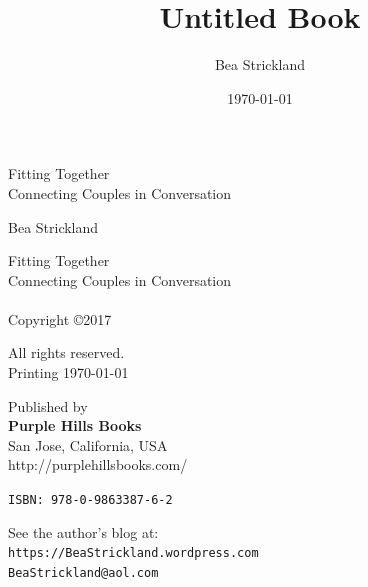 

\usepackage{lineno}



\frontmatter



\cleardoublepage
\title{Untitled Book}
\author{Bea Strickland}
\date{\today}


\begin{center}

{\noindent\huge Fitting Together\\}
{\noindent Connecting Couples in Conversation \\}

\vspace{0.75in}

{\noindent Bea Strickland}

\vspace{1in}


\end{center}


\newpage
{
    \noindent
    Fitting Together\\
    Connecting Couples in Conversation\\
    \\
    Copyright \copyright 2017 
    \newline

    \noindent
    All rights reserved.\\
    Printing \today
    \newline

    \noindent
    Published by \\
    \textbf{Purple Hills Books}\\
    San Jose, California, USA\\
    http://purplehillsbooks.com/


    \vspace{0.25in}
    \noindent
    \texttt{ISBN: 978-0-9863387-6-2}

    \vspace{0.75in}
    \noindent
    See the author's blog at:\\
    \texttt{https://BeaStrickland.wordpress.com}\\
    \texttt{BeaStrickland@aol.com}
}

\newpage

\vspace{1.75in}

